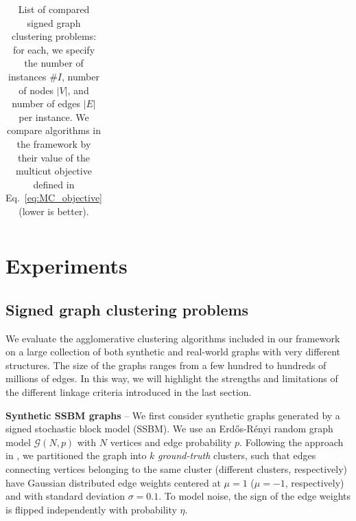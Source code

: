 \begin{table}[t]
\begin{subtable}[t!]{\textwidth}
\begin{tabular}{l  c  r  c  c  | r r r r r r}


        \end{tabular}
    \end{subtable} 
    \caption{List of compared signed graph clustering problems: for each, we specify the number of instances $\# I$, number of nodes $|V|$, and number of edges $|E|$ per instance. We compare algorithms in the \algname{} framework by their value of the multicut objective defined in Eq.~\ref{eq:MC_objective} (lower is better).} 
    \label{tab:datasets_and_energies}
\end{table}


\section{Experiments}\label{sec:neuro_segm_exp}
\subsection{Signed graph clustering problems} \label{sec:clustering_problems}
We evaluate the agglomerative clustering algorithms included in our framework on a large collection of both synthetic and real-world graphs with very different structures. The size of the graphs ranges from a few hundred to hundreds of millions of edges. In this way, we will highlight the strengths and limitations of the different linkage criteria introduced in the last section. 

\textbf{Synthetic SSBM graphs} -- We first consider synthetic graphs generated by a signed stochastic block model (SSBM). We use an Erd\H os-R\'enyi random graph model $\mathcal{G}(N,p)$ with $N$ vertices and edge probability $p$. Following the approach in \cite{Cucuringu2019SPONGEAG}, we partitioned the graph into $k$ \emph{ground-truth} clusters, such that edges connecting vertices belonging to the same cluster (different clusters, respectively) have Gaussian distributed edge weights centered at $\mu=1$ ($\mu=-1$, respectively) and with standard deviation $\sigma=0.1$. To model noise, the sign of the edge weights is flipped independently with probability $\eta$.


